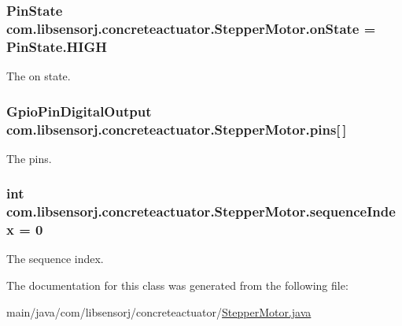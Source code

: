 \subsubsection[{on\+State}]{\setlength{\rightskip}{0pt plus 5cm}Pin\+State com.\+libsensorj.\+concreteactuator.\+Stepper\+Motor.\+on\+State = Pin\+State.\+H\+I\+G\+H\hspace{0.3cm}{\ttfamily [private]}}\label{classcom_1_1libsensorj_1_1concreteactuator_1_1StepperMotor_abcf0537132ae7308214b40125aaeef27}
The on state. \hypertarget{classcom_1_1libsensorj_1_1concreteactuator_1_1StepperMotor_aefca907f907fd398b7bcdd902e04b928}{}
\subsubsection[{pins}]{\setlength{\rightskip}{0pt plus 5cm}Gpio\+Pin\+Digital\+Output com.\+libsensorj.\+concreteactuator.\+Stepper\+Motor.\+pins\mbox{[}$\,$\mbox{]}\hspace{0.3cm}{\ttfamily [private]}}\label{classcom_1_1libsensorj_1_1concreteactuator_1_1StepperMotor_aefca907f907fd398b7bcdd902e04b928}
The pins. \hypertarget{classcom_1_1libsensorj_1_1concreteactuator_1_1StepperMotor_adc7f82436f61b2a32539f5af34b1c681}{}
\subsubsection[{sequence\+Index}]{\setlength{\rightskip}{0pt plus 5cm}int com.\+libsensorj.\+concreteactuator.\+Stepper\+Motor.\+sequence\+Index = 0\hspace{0.3cm}{\ttfamily [private]}}\label{classcom_1_1libsensorj_1_1concreteactuator_1_1StepperMotor_adc7f82436f61b2a32539f5af34b1c681}
The sequence index. 

The documentation for this class was generated from the following file\+:\begin{DoxyCompactItemize}
\item 
main/java/com/libsensorj/concreteactuator/\hyperlink{StepperMotor_8java}{Stepper\+Motor.\+java}\end{DoxyCompactItemize}
